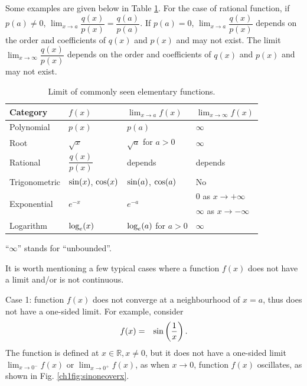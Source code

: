 Some examples are given below in Table \ref{chi1table:limitoffunction}. For the case of rational function, if $p(a) \neq 0$, $\lim_{x\rightarrow a}\dfrac{q(x)}{p(x)} = \dfrac{q(a)}{p(a)}$. If $p(a)=0$, $\lim_{x\rightarrow a}\dfrac{q(x)}{p(x)}$ depends on the order and coefficients of $q(x)$ and $p(x)$ and may not exist. The limit $\lim_{x\rightarrow \infty}\dfrac{q(x)}{p(x)}$ depends on the order and coefficients of $q(x)$ and $p(x)$ and may not exist.


\begin{table}[!htb]
\centering\caption{Limit of commonly seen elementary functions.} \label{chi1table:limitoffunction}
\begin{tabular}{llll}
\hline
Category & $f(x)$ & $\lim_{x\rightarrow a}f(x)$ & $\lim_{x\rightarrow \infty}f(x)$ \\ \hline
Polynomial & $p(x)$ & $p(a)$ & $\infty$ \\
Root & $\sqrt{x}$ & $\sqrt{a}$ for $a>0$ & $\infty$ \\
Rational & $\dfrac{q(x)}{p(x)}$ & depends & depends \\
Trigonometric & $\textup{sin}(x)$, $\textup{cos}(x)$ & $\textup{sin}(a)$, $\textup{cos}(a)$ & No \\
\multirow{2}{*}{Exponential} & \multirow{2}{*}{$e^{-x}$} & \multirow{2}{*}{$e^{-a}$} & $0$ as $x\rightarrow +\infty$ \\
& & & $\infty$ as $x\rightarrow -\infty$ \\
Logarithm & $\textup{log}_e(x)$ & $\textup{log}_e(a)$ for $a>0$ & $\infty$ \\ \hline
\end{tabular}

\begin{flushleft}
\footnotesize
``$\infty$'' stands for ``unbounded''.
\end{flushleft}

\end{table}

It is worth mentioning a few typical cases where a function $f(x)$ does not have a limit and/or is not continuous.

Case 1: function $f(x)$ does not converge at a neighbourhood of $x=a$, thus does not have a one-sided limit. For example, consider
\begin{eqnarray}
  f(x) &=& \textup{sin}\left(\dfrac{1}{x}\right). \nonumber
\end{eqnarray}
The function is defined at $x\in\mathbb{R},x\neq0$, but it does not have a one-sided limit $\lim_{x\rightarrow 0^-}f(x)$ or $\lim_{x\rightarrow 0^+}f(x)$, as when $x\rightarrow0$, function $f(x)$ oscillates, as shown in Fig. \ref{ch1fig:sinoneoverx}.

